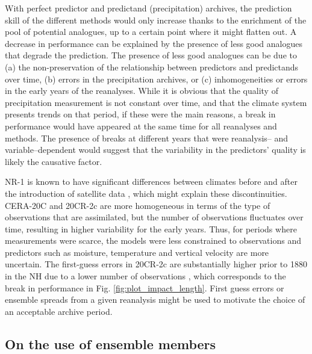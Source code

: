 \documentclass[smallextended]{svjour3}       %
\begin{document}
	With perfect predictor and predictand (precipitation) archives, the prediction skill of the different methods would only increase thanks to the enrichment of the pool of potential analogues, up to a certain point where it might flatten out. A decrease in performance can be explained by the presence of less good analogues that degrade the prediction. The presence of less good analogues can be due to (a) the non-preservation of the relationship between predictors and predictands over time, (b) errors in the precipitation archives, or (c) inhomogeneities or errors in the early years of the reanalyses. While it is obvious that the quality of precipitation measurement is not constant over time, and that the climate system presents trends on that period, if these were the main reasons, a break in performance would have appeared at the same time for all reanalyses and methods. The presence of breaks at different years that were reanalysis-- and variable--dependent would suggest that the variability in the predictors' quality is likely the causative factor.
	
	NR-1 is known to have significant differences between climates before and after the introduction of satellite data \citep{Kistler2001}, which might explain these discontinuities. CERA-20C and 20CR-2c are more homogeneous in terms of the type of observations that are assimilated, but the number of observations fluctuates over time, resulting in higher variability for the early years. Thus, for periods where measurements were scarce, the models were less constrained to observations and predictors such as moisture, temperature and vertical velocity are more uncertain. The first-guess errors in 20CR-2c are substantially higher prior to 1880 in the NH due to a lower number of observations \citep{Compo2011}, which corresponds to the break in performance in Fig. \ref{fig:plot_impact_length}. First guess errors or ensemble spreads from a given reanalysis might be used to motivate the choice of an acceptable archive period.
	
	
	\subsection{On the use of ensemble members}
	\label{sec:ensemble}
	
\end{document}
